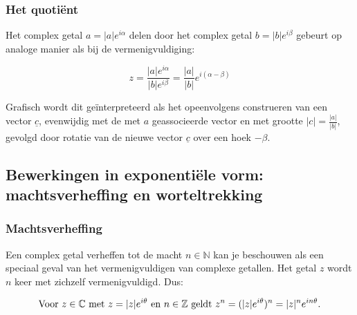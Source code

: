 \subsubsection{Het quoti\"{e}nt}

Het complex getal $a=|a|e^{i\alpha}$ delen door het complex getal $b=|b|e^{i\beta}$ gebeurt op analoge manier als bij de vermenigvuldiging:\\

\begin{eigenschap}
	\begin{framed}
	\[ z=\frac{|a|e^{i\alpha}}{|b|e^{i\beta}}=\frac{|a|}{|b|}e^{i (\alpha - \beta)}  \]
\end{framed}
\end{eigenschap}

Grafisch wordt dit ge\"{i}nterpreteerd als het opeenvolgens construeren van een vector $\underline{c}$, evenwijdig met de met $a$ geassocieerde vector en met grootte $|c|=\frac{|a|}{|b|}$, gevolgd door rotatie van de nieuwe vector $\underline{c}$ over een hoek $-\beta$.\\

\subsection{Bewerkingen in exponenti\"{e}le vorm: machtsverheffing en worteltrekking}

\subsubsection{Machtsverheffing}

Een complex getal verheffen tot de macht $n \in \mathbb{N}$ kan je beschouwen als een speciaal geval van het vermenigvuldigen van complexe getallen. Het getal $z$ wordt $n$ keer met zichzelf vermenigvuldigd. Dus:\\

\begin{definitie}
	\begin{framed}
\begin{equation*}
\text{Voor } z \in \mathbb{C} \text{ met } z = |z|e^{i\theta} \text{ en } n \in \mathbb{Z} \text{ geldt } \\
z^n = (|z|e^{i \theta})^n = |z|^n e^{i n \theta}.
\end{equation*}
\end{framed}
\end{definitie}


